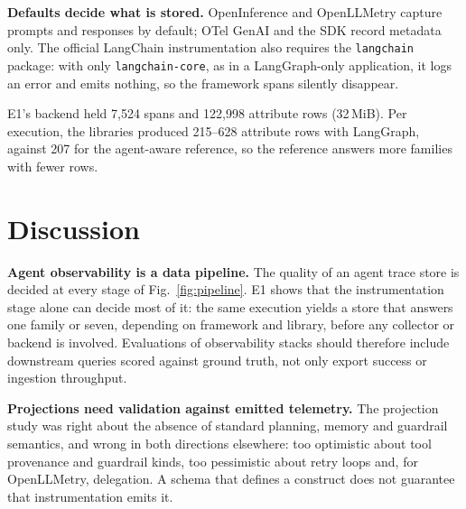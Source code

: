\documentclass[conference]{IEEEtran}
\begin{document}
\textbf{Defaults decide what is stored.} OpenInference and OpenLLMetry
capture prompts and responses by default; OTel GenAI and the SDK record
metadata only. The official LangChain instrumentation also requires the
\texttt{langchain} package: with only \texttt{langchain-core}, as in a
LangGraph-only application, it logs an error and emits nothing, so the
framework spans silently disappear.

E1's backend held 7,524 spans and 122,998 attribute rows (32\,MiB).
Per execution, the libraries produced 215--628 attribute rows with
LangGraph, against 207 for the agent-aware reference, so the reference
answers more families with fewer rows.

\section{Discussion}
\label{sec:discussion}

\textbf{Agent observability is a data pipeline.} The quality of an
agent trace store is decided at every stage of
Fig.~\ref{fig:pipeline}. E1 shows that the instrumentation stage alone
can decide most of it: the same execution yields a store that answers
one family or seven, depending on framework and library, before any
collector or backend is involved. Evaluations of observability stacks
should therefore include downstream queries scored against ground
truth, not only export success or ingestion throughput.

\textbf{Projections need validation against emitted telemetry.} The
projection study was right about the absence of standard planning,
memory and guardrail semantics, and wrong in both directions elsewhere:
too optimistic about tool provenance and guardrail kinds, too
pessimistic about retry loops and, for OpenLLMetry, delegation. A
schema that defines a construct does not guarantee that instrumentation
emits it.
\end{document}
